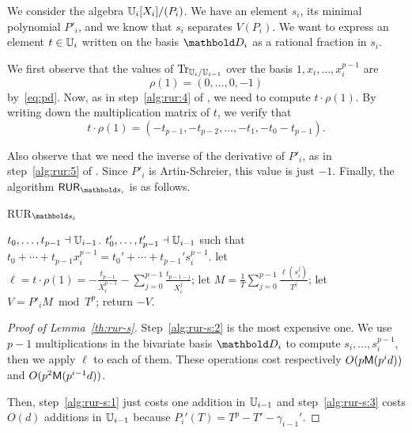 We consider the algebra $\mathbb{U}_i[X_i]/(P_i)$. We have an element $s_i$,
its minimal polynomial $P'_i$, and we know that $s_i$ separates
$V(P_i)$. We want to express an element $t\in\mathbb{U}_i$ written on the
basis $\basis{D}_i$ as a rational fraction in $s_i$.

We first observe that the values of $\operatorname{Tr}_{\mathbb{U}_i/\mathbb{U}_{i-1}}$ over the
basis $1,x_i,\ldots,x_i^{p-1}$ are 
\begin{equation}
  \label{eq:110}
  \rho(1) = (0,\ldots,0,-1)
\end{equation}
by~\eqref{eq:pd}. Now, as in step~\ref{alg:rur:4} of
\hyperref[alg:rur]{}, we need to compute $t\cdot\rho(1)$. By
writing down the multiplication matrix of $t$, we verify that
\begin{equation}
  \label{eq:111}
  t\cdot\rho(1) = (-t_{p-1}, -t_{p-2}, \ldots, -t_1, -t_0-t_{p-1})
  \text{.}
\end{equation}

Also observe that we need the inverse of the derivative of $P'_i$, as
in step~\ref{alg:rur:5} of \hyperref[alg:rur]{}. Since $P'_i$ is Artin-Schreier,
this value is just $-1$. Finally, the algorithm
\hyperref[alg:RUR-si]{$\alg{RUR}_{\lst{s}_i}$} is as follows.

\begin{algorithm}
  \caption{\label{alg:RUR-si}RUR$_{\lst{s}_i}$}
  \begin{algorithmic}[1]
    \REQUIRE $t_0,\ldots,t_{p-1}\dashv\mathbb{U}_{i-1}$.
    \ENSURE $t_0',\ldots,t_{p-1}'\dashv\mathbb{U}_{i-1}$ such that $t_0+\cdots+t_{p-1}x_i^{p-1}=t_0'+\cdots+t_{p-1}'s_i^{p-1}$.
    \STATE \label{alg:rur-s:1}let $\ell = t\cdot\rho(1) =  -\frac{t_{p-1}}{X_i^{p-1}} - \sum_{j=0}^{p-1} \frac{t_{p-1-j}}{X_i^j}$;
    \STATE \label{alg:rur-s:2}let $M = \frac{1}{T}\sum_{j=0}^{p-1}\frac{\ell(s_i^j)}{T^j}$;
    \STATE \label{alg:rur-s:3}let $V = P'_iM \bmod T^p$;
    \STATE return $-V$.
  \end{algorithmic}
\end{algorithm}

\begin{proof}[Proof of Lemma~\ref{th:rur-s}]
  Step~\ref{alg:rur-s:2} is the most expensive one. We use $p-1$
  multiplications in the bivariate basis $\basis{D}_i$ to compute
  $s_i,\ldots,s_i^{p-1}$, then we apply $\ell$ to each of them. These
  operations cost respectively $O(p\mathsf{M}(p^id))$ and
  $O(p^2\mathsf{M}(p^{i-1}d))$.

  Then, step~\ref{alg:rur-s:1} just costs one addition in $\mathbb{U}_{i-1}$
  and step~\ref{alg:rur-s:3} costs $O(d)$ additions in $\mathbb{U}_{i-1}$
  because $P_i'(T)=T^p-T'-\gamma_{i-1}'$.
\end{proof}


